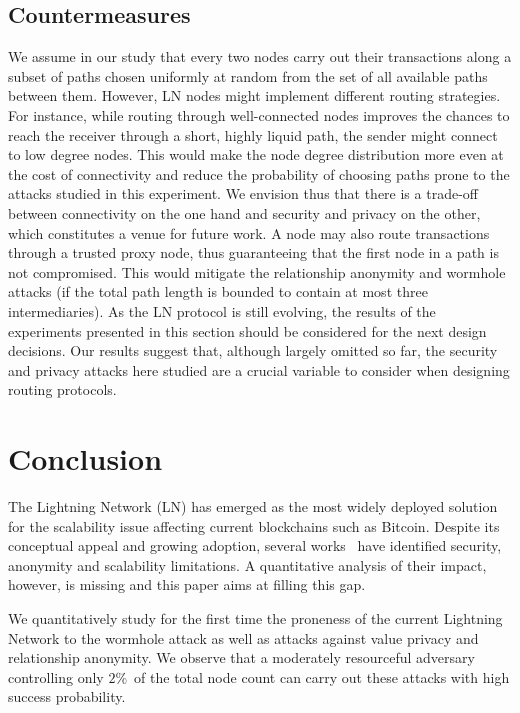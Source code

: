 \subsection{Countermeasures}
We assume in our study that every two nodes carry out their transactions along a subset of paths chosen uniformly at random from the set of all available paths between them.
However, LN nodes might implement different routing strategies.
For instance, while routing through well-connected nodes improves the chances to reach the receiver through a short, highly liquid path, the sender might connect to low degree nodes.
This would make the node degree distribution more even at the cost of connectivity and reduce the probability of choosing paths prone to the attacks studied in this experiment.
We envision thus that there is a trade-off between connectivity on the one hand and security and privacy on the other, which constitutes a venue for future work.
A node may also route transactions through a trusted proxy node, thus guaranteeing that the first node in a path is not compromised.
This would mitigate the relationship anonymity and wormhole attacks (if the total path length is bounded to contain at most three intermediaries).
As the LN protocol is still evolving, the results of the experiments presented in this section should be considered for the next design decisions.
Our results suggest that, although largely omitted so far, the security and privacy attacks here studied are a crucial variable to consider when designing routing protocols.


\section{Conclusion}
\label{sec:conclusions}

The Lightning Network (LN) has emerged as the most widely deployed solution for the scalability issue affecting current blockchains such as Bitcoin.
Despite its conceptual appeal and growing adoption, several works~\cite{Malavolta2017, Malavolta2019} have identified security, anonymity and scalability limitations.
A quantitative analysis of their impact, however, is missing and this paper aims at filling this gap.

We quantitatively study for the first time the proneness of the current Lightning Network to the wormhole attack as well as attacks against value privacy and relationship anonymity.
We observe that a moderately resourceful adversary controlling only $2\%$~of the total node count can carry out these attacks with high success probability.
